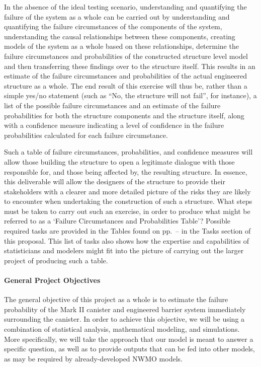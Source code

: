 In the absence of the ideal testing scenario, understanding and quantifying the failure of the system as a whole can be carried out by understanding and quantifying the failure circumstances of the components of the system, understanding the causal relationships between these components, creating models of the system as a whole based on these relationships, determine the failure circumstances and probabilities of the constructed structure level model and then transferring these findings over to the structure itself. This results in an estimate of the failure circumstances and probabilities of the actual engineered structure as a whole.
\newl
The end result of this exercise will thus be, rather than a simple yes/no statement (such as ``No, the structure will not fail'', for instance), a list of the possible failure circumstances and an estimate of the failure probabilities for both the structure components and the structure itself, along with a confidence measure indicating a level of confidence in the failure probabilities calculated for each failure circumstance.
\par Such a table of failure circumstances, probabilities, and confidence measures will allow those building the structure to open a legitimate dialogue with those responsible for, and those being affected by, the resulting structure. In essence, this deliverable will allow the designers of the structure to provide their stakeholders with a clearer and more detailed picture of the risks they are likely to encounter when undertaking the construction of such a structure.
\newl 
What steps must be taken to carry out such an exercise, in order to produce what might be referred to as a `Failure Circumstances and Probabilities Table'? Possible required tasks are provided in the Tables found on pp.~\pageref{table:task1}--\pageref{table:task3} in the Tasks section of this proposal. This list of tasks also shows how the expertise and capabilities of statisticians and modelers might fit into the picture of carrying out the larger project of producing such a table.

\paragraph{General Project Objectives} The general objective of this project as a whole is to estimate the failure probability of the Mark II canister and engineered barrier system immediately surrounding the canister. In order to achieve this objective, we will be using a combination of statistical analysis, mathematical modeling, and simulations.
\newl 
More specifically, we will take the approach that our model is meant to answer a specific question, as well as to provide outputs that can be fed into other models, as may be required by already-developed NWMO models. 
